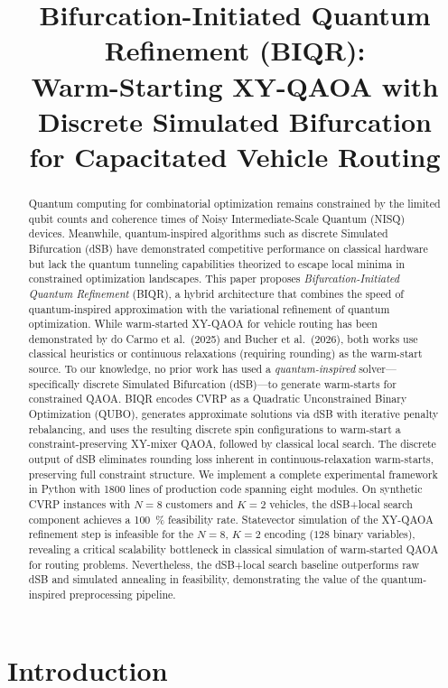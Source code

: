 \documentclass[11pt,a4paper]{article}
\title{\textbf{Bifurcation-Initiated Quantum Refinement (BIQR):\\Warm-Starting XY-QAOA with Discrete Simulated Bifurcation\\for Capacitated Vehicle Routing}}
\author{}
\date{}
\theoremstyle{definition}
\begin{document}
\maketitle

\begin{abstract}
Quantum computing for combinatorial optimization remains constrained by the limited qubit counts and coherence times of Noisy Intermediate-Scale Quantum (NISQ) devices. Meanwhile, quantum-inspired algorithms such as discrete Simulated Bifurcation (dSB) have demonstrated competitive performance on classical hardware but lack the quantum tunneling capabilities theorized to escape local minima in constrained optimization landscapes. This paper proposes \emph{Bifurcation-Initiated Quantum Refinement} (BIQR), a hybrid architecture that combines the speed of quantum-inspired approximation with the variational refinement of quantum optimization. While warm-started XY-QAOA for vehicle routing has been demonstrated by do Carmo et al.\ (2025) and Bucher et al.\ (2026), both works use classical heuristics or continuous relaxations (requiring rounding) as the warm-start source. To our knowledge, no prior work has used a \emph{quantum-inspired} solver---specifically discrete Simulated Bifurcation (dSB)---to generate warm-starts for constrained QAOA. BIQR encodes CVRP as a Quadratic Unconstrained Binary Optimization (QUBO), generates approximate solutions via dSB with iterative penalty rebalancing, and uses the resulting discrete spin configurations to warm-start a constraint-preserving XY-mixer QAOA, followed by classical local search. The discrete output of dSB eliminates rounding loss inherent in continuous-relaxation warm-starts, preserving full constraint structure. We implement a complete experimental framework in Python with \num{1800} lines of production code spanning eight modules. On synthetic CVRP instances with $N=8$ customers and $K=2$ vehicles, the dSB+local search component achieves a \SI{100}{\percent} feasibility rate. Statevector simulation of the XY-QAOA refinement step is infeasible for the $N=8$, $K=2$ encoding ($128$ binary variables), revealing a critical scalability bottleneck in classical simulation of warm-started QAOA for routing problems. Nevertheless, the dSB+local search baseline outperforms raw dSB and simulated annealing in feasibility, demonstrating the value of the quantum-inspired preprocessing pipeline.
\end{abstract}

\section{Introduction}\label{sec:intro}
\end{document}
